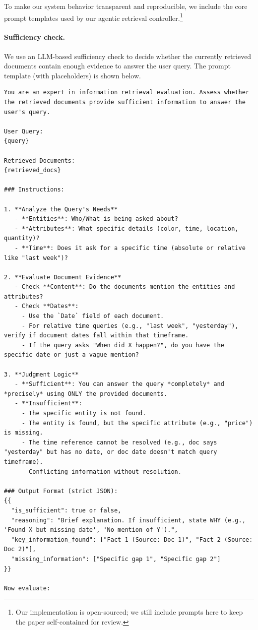\noindent To make our system behavior transparent and reproducible, we include the core prompt templates used by our agentic retrieval controller.\footnote{Our implementation is open-sourced; we still include prompts here to keep the paper self-contained for review.}

\paragraph{Sufficiency check.} We use an LLM-based sufficiency check to decide whether the currently retrieved documents contain enough evidence to answer the user query. The prompt template (with placeholders) is shown below.

{\footnotesize
\begin{Verbatim}[breaklines=true,breakanywhere=true]
You are an expert in information retrieval evaluation. Assess whether the retrieved documents provide sufficient information to answer the user's query.

User Query:
{query}

Retrieved Documents:
{retrieved_docs}

### Instructions:

1. **Analyze the Query's Needs**
   - **Entities**: Who/What is being asked about?
   - **Attributes**: What specific details (color, time, location, quantity)?
   - **Time**: Does it ask for a specific time (absolute or relative like "last week")?

2. **Evaluate Document Evidence**
   - Check **Content**: Do the documents mention the entities and attributes?
   - Check **Dates**: 
     - Use the `Date` field of each document.
     - For relative time queries (e.g., "last week", "yesterday"), verify if document dates fall within that timeframe.
     - If the query asks "When did X happen?", do you have the specific date or just a vague mention?

3. **Judgment Logic**
   - **Sufficient**: You can answer the query *completely* and *precisely* using ONLY the provided documents.
   - **Insufficient**: 
     - The specific entity is not found.
     - The entity is found, but the specific attribute (e.g., "price") is missing.
     - The time reference cannot be resolved (e.g., doc says "yesterday" but has no date, or doc date doesn't match query timeframe).
     - Conflicting information without resolution.

### Output Format (strict JSON):
{{
  "is_sufficient": true or false,
  "reasoning": "Brief explanation. If insufficient, state WHY (e.g., 'Found X but missing date', 'No mention of Y').",
  "key_information_found": ["Fact 1 (Source: Doc 1)", "Fact 2 (Source: Doc 2)"],
  "missing_information": ["Specific gap 1", "Specific gap 2"]
}}

Now evaluate:
\end{Verbatim}
}

